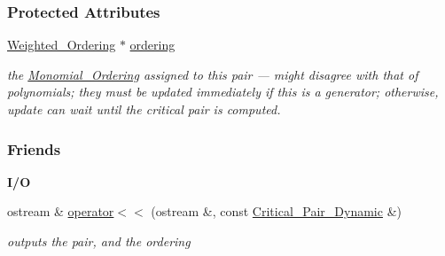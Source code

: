 \subsubsection*{Protected Attributes}
\begin{DoxyCompactItemize}
\item 
\mbox{\label{group___g_b_computation_a29d3c615e66d3840c3aeb8ad9bc51647}} 
\hyperlink{group__orderinggroup_class_weighted___ordering}{Weighted\+\_\+\+Ordering} $\ast$ \hyperlink{group___g_b_computation_a29d3c615e66d3840c3aeb8ad9bc51647}{ordering}
\begin{DoxyCompactList}\small\item\em the {\ttfamily \hyperlink{group__orderinggroup_class_monomial___ordering}{Monomial\+\_\+\+Ordering}} assigned to this pair --- might disagree with that of polynomials; they must be updated immediately if this is a generator; otherwise, update can wait until the critical pair is computed. \end{DoxyCompactList}\end{DoxyCompactItemize}
\subsubsection*{Friends}
\begin{Indent}\textbf{ I/O}\par
\begin{DoxyCompactItemize}
\item 
\mbox{\label{group___g_b_computation_a3c0c965ed52ffe0faf759023605adaf2}} 
ostream \& \hyperlink{group___g_b_computation_a3c0c965ed52ffe0faf759023605adaf2}{operator$<$$<$} (ostream \&, const \hyperlink{group___g_b_computation_class_critical___pair___dynamic}{Critical\+\_\+\+Pair\+\_\+\+Dynamic} \&)
\begin{DoxyCompactList}\small\item\em outputs the pair, and the ordering \end{DoxyCompactList}\end{DoxyCompactItemize}
\end{Indent}



